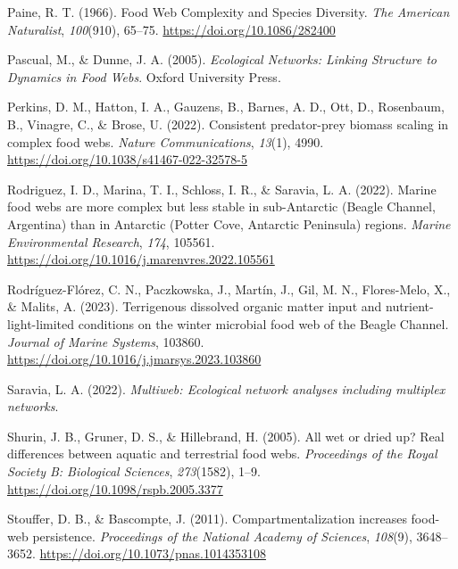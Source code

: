 \documentclass[
]{article}
\newlength{\cslhangindent}
\newlength{\cslentryspacingunit} %
\newenvironment{CSLReferences}[2] %
 {%
  \setlength{\parindent}{0pt}
  \ifodd #1
  \let\oldpar\par
  \def\par{\hangindent=\cslhangindent\oldpar}
  \fi
  \setlength{\parskip}{#2\cslentryspacingunit}
 }%
 {}
\begin{document}
\begin{CSLReferences}{1}{0}
\leavevmode{}%
Paine, R. T. (1966). Food {Web Complexity} and {Species Diversity}.
\emph{The American Naturalist}, \emph{100}(910), 65--75.
\url{https://doi.org/10.1086/282400}

\leavevmode{}%
Pascual, M., \& Dunne, J. A. (2005). \emph{Ecological {Networks}:
{Linking Structure} to {Dynamics} in {Food Webs}}. {Oxford University
Press}.

\leavevmode{}%
Perkins, D. M., Hatton, I. A., Gauzens, B., Barnes, A. D., Ott, D.,
Rosenbaum, B., Vinagre, C., \& Brose, U. (2022). Consistent
predator-prey biomass scaling in complex food webs. \emph{Nature
Communications}, \emph{13}(1), 4990.
\url{https://doi.org/10.1038/s41467-022-32578-5}

\leavevmode{}%
Rodriguez, I. D., Marina, T. I., Schloss, I. R., \& Saravia, L. A.
(2022). Marine food webs are more complex but less stable in
sub-{Antarctic} ({Beagle Channel}, {Argentina}) than in {Antarctic}
({Potter Cove}, {Antarctic Peninsula}) regions. \emph{Marine
Environmental Research}, \emph{174}, 105561.
\url{https://doi.org/10.1016/j.marenvres.2022.105561}

\leavevmode{}%
Rodríguez-Flórez, C. N., Paczkowska, J., Martín, J., Gil, M. N.,
Flores-Melo, X., \& Malits, A. (2023). Terrigenous dissolved organic
matter input and nutrient-light-limited conditions on the winter
microbial food web of the {Beagle Channel}. \emph{Journal of Marine
Systems}, 103860. \url{https://doi.org/10.1016/j.jmarsys.2023.103860}

\leavevmode{}%
Saravia, L. A. (2022). \emph{Multiweb: {Ecological} network analyses
including multiplex networks}.

\leavevmode{}%
Shurin, J. B., Gruner, D. S., \& Hillebrand, H. (2005). All wet or dried
up? {Real} differences between aquatic and terrestrial food webs.
\emph{Proceedings of the Royal Society B: Biological Sciences},
\emph{273}(1582), 1--9. \url{https://doi.org/10.1098/rspb.2005.3377}

\leavevmode{}%
Stouffer, D. B., \& Bascompte, J. (2011). Compartmentalization increases
food-web persistence. \emph{Proceedings of the National Academy of
Sciences}, \emph{108}(9), 3648--3652.
\url{https://doi.org/10.1073/pnas.1014353108}


\end{CSLReferences}
\end{document}
